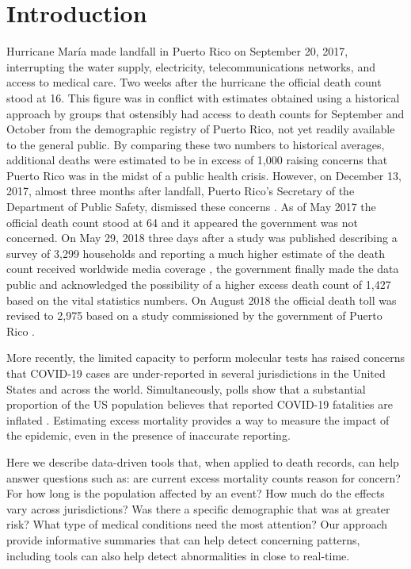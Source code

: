 \documentclass[11pt]{article}
\begin{document}
\section{Introduction}
\label{sec:introduction}
Hurricane Mar\'ia made landfall in Puerto Rico on September 20, 2017, interrupting the water supply, electricity, telecommunications networks, and access to medical care\cite{updates2018puerto, rogers2017puerto}. Two weeks after the hurricane the official death count stood at 16\cite{hoyos2018puerto}. This figure was in conflict with estimates obtained using a historical approach by groups that ostensibly had access to death counts for September and October from the demographic registry of Puerto Rico, not yet readily available to the general public. By comparing these two numbers to historical averages, additional deaths were estimated to be in excess of 1,000 \cite{santos2018use, robles2017official, rivera2018estimating, pascual2017nearly} raising concerns that Puerto Rico was in the midst of a public health crisis. However, on December 13, 2017, almost three months after landfall, Puerto Rico’s Secretary of the Department of Public Safety, dismissed these concerns \cite{robles2017official}. As of May 2017 the official death count stood at 64 \cite{hoyos2018puerto} and it appeared the government was not concerned. On May 29, 2018 three days after a study was published describing a survey of 3,299 households and reporting a much higher estimate of the death count received worldwide media coverage \cite{kishore2018mortality}, the government finally made the data public and acknowledged the possibility of a higher excess death count of 1,427 \cite{report2019} based on the vital statistics numbers. On August 2018 the official death toll was revised to 2,975 based on a study commissioned by the government of Puerto Rico \cite{santos2018differential}.

More recently, the limited capacity to perform molecular tests has raised concerns that COVID-19 cases are under-reported in several jurisdictions in the United States and across the world. Simultaneously, polls show that a substantial proportion of the US population believes that reported COVID-19 fatalities are inflated \cite{talev2020}. Estimating excess mortality provides a way to measure the impact of the epidemic, even in the presence of inaccurate reporting.

Here we describe data-driven tools that, when applied to death records, can help answer questions such as: are current excess mortality counts reason for concern? For how long is the population affected by an event?  How much do the effects vary across jurisdictions?  Was there a specific demographic that was at greater risk? What type of medical conditions need the most attention? Our approach provide informative summaries that can help detect concerning patterns, including tools can also help detect abnormalities in close to real-time. 
\end{document}
